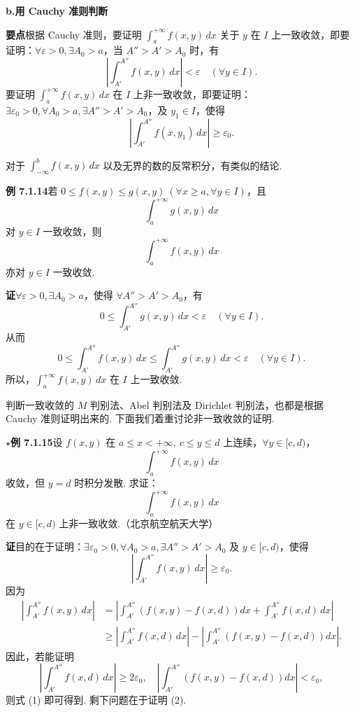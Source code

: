 \documentclass[UTF8, 12pt, fontset=fandol, oneside]{ctexart}
\begin{document}
\noindent\textbf{b.\quad 用 Cauchy 准则判断}

\noindent\textbf{要点}\quad 根据 Cauchy 准则，要证明 $\displaystyle\int_a^{+\infty}f(x,y)\,dx$ 关于 $y$ 在 $I$ 上一致收敛，即要证明：$\forall\varepsilon>0,\exists A_0>a$，当 $A''>A'>A_0$ 时，有
\[
\left|\int_{A'}^{A''}f(x,y)\,dx\right|<\varepsilon\quad(\forall y\in I).
\]
要证明 $\displaystyle\int_a^{+\infty}f(x,y)\,dx$ 在 $I$ 上非一致收敛，即要证明：$\exists\varepsilon_0>0,\forall A_0>a,\exists A''>A'>A_0$，及 $y_1\in I$，使得
\[
\left|\int_{A'}^{A''}f(x,y_1)\,dx\right|\ge\varepsilon_0.
\]

对于 $\displaystyle\int_{-\infty}^b f(x,y)\,dx$ 以及无界的数的反常积分，有类似的结论.

\noindent\textbf{例 7.1.14}\quad 若 $0\le f(x,y)\le g(x,y)\ (\forall x\ge a,\forall y\in I)$，且
\[
\int_a^{+\infty}g(x,y)\,dx
\]
对 $y\in I$ 一致收敛，则
\[
\int_a^{+\infty}f(x,y)\,dx
\]
亦对 $y\in I$ 一致收敛.

\noindent\textbf{证}\quad $\forall\varepsilon>0,\exists A_0>a$，使得 $\forall A''>A'>A_0$，有
\[
0\le\int_{A'}^{A''}g(x,y)\,dx<\varepsilon\quad(\forall y\in I).
\]
从而
\[
0\le\int_{A'}^{A''}f(x,y)\,dx\le\int_{A'}^{A''}g(x,y)\,dx<\varepsilon\quad(\forall y\in I).
\]
所以，$\displaystyle\int_a^{+\infty}f(x,y)\,dx$ 在 $I$ 上一致收敛.

判断一致收敛的 $M$ 判别法、Abel 判别法及 Dirichlet 判别法，也都是根据 Cauchy 准则证明出来的. 下面我们着重讨论非一致收敛的证明.

\noindent\textbf{$\star$例 7.1.15}\quad 设 $f(x,y)$ 在 $a\le x<+\infty,\ c\le y\le d$ 上连续，$\forall y\in[c,d)$，
\[
\int_a^{+\infty}f(x,y)\,dx
\]
收敛，但 $y=d$ 时积分发散. 求证：
\[
\int_a^{+\infty}f(x,y)\,dx
\]
在 $y\in[c,d)$ 上非一致收敛.（北京航空航天大学）

\noindent\textbf{证}\quad 目的在于证明：$\exists\varepsilon_0>0,\forall A_0>a,\exists A''>A'>A_0$ 及 $y\in[c,d)$，使得
\[
\left|\int_{A'}^{A''}f(x,y)\,dx\right|\ge\varepsilon_0.
\tag{1}
\]
因为
\[
\begin{aligned}
\left|\int_{A'}^{A''}f(x,y)\,dx\right|
&=\left|\int_{A'}^{A''}\left(f(x,y)-f(x,d)\right)dx+\int_{A'}^{A''}f(x,d)\,dx\right|\\
&\ge\left|\int_{A'}^{A''}f(x,d)\,dx\right|
-\left|\int_{A'}^{A''}\left(f(x,y)-f(x,d)\right)dx\right|.
\end{aligned}
\]
因此，若能证明
\[
\left|\int_{A'}^{A''}f(x,d)\,dx\right|\ge2\varepsilon_0,\quad
\left|\int_{A'}^{A''}\left(f(x,y)-f(x,d)\right)dx\right|<\varepsilon_0,
\tag{2}
\]
则式 (1) 即可得到. 剩下问题在于证明 (2).
\end{document}
